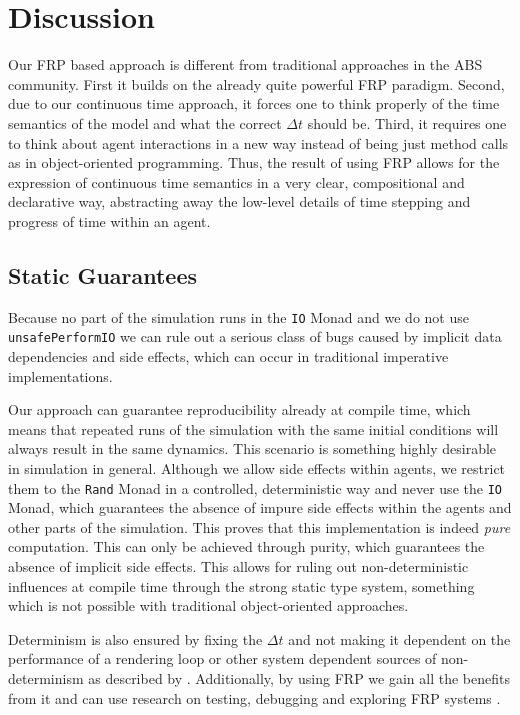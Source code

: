 \section{Discussion}
Our FRP based approach is different from traditional approaches in the ABS community. First it builds on the already quite powerful FRP paradigm. Second, due to our continuous time approach, it forces one to think properly of the time semantics of the model and what the correct $\Delta t$ should be. Third, it requires one to think about agent interactions in a new way instead of being just method calls as in object-oriented programming. Thus, the result of using FRP allows for the expression of continuous time semantics in a very clear, compositional and declarative way, abstracting away the low-level details of time stepping and progress of time within an agent.

\subsection{Static Guarantees}
Because no part of the simulation runs in the \texttt{IO} Monad and we do not use \texttt{unsafePerformIO} we can rule out a serious class of bugs caused by implicit data dependencies and side effects, which can occur in traditional imperative implementations.

Our approach can guarantee reproducibility already at compile time, which means that repeated runs of the simulation with the same initial conditions will always result in the same dynamics. This scenario is something highly desirable in simulation in general. Although we allow side effects within agents, we restrict them to the \texttt{Rand} Monad in a controlled, deterministic way and never use the \texttt{IO} Monad, which guarantees the absence of impure side effects within the agents and other parts of the simulation. This proves that this implementation is indeed \textit{pure} computation. This can only be achieved through purity, which guarantees the absence of implicit side effects. This allows for ruling out non-deterministic influences at compile time through the strong static type system, something which is not possible with traditional object-oriented approaches.

Determinism is also ensured by fixing the $\Delta t$ and not making it dependent on the performance of a rendering loop or other system dependent sources of non-determinism as described by \cite{perez_testing_2017}. Additionally, by using FRP we gain all the benefits from it and can use research on testing, debugging and exploring FRP systems \cite{perez_back_2017,perez_testing_2017}.

